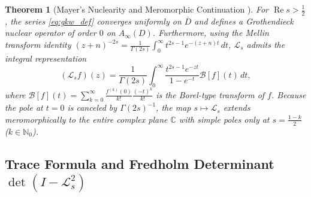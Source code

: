 \documentclass[11pt,a4paper]{article}
\newtheorem{theorem}{Theorem}[section]
\newcommand{\Det}{\operatorname{det}}
\newcommand{\Real}{\operatorname{Re}}
\begin{document}
\begin{theorem}[Mayer's Nuclearity and Meromorphic Continuation \cite{Mayer1990}]
For $\Real s > \frac{1}{2}$, the series \eqref{eq:gkw_def} converges uniformly on $\overline{D}$ and defines a Grothendieck nuclear operator of order $0$ on $A_\infty(D)$. Furthermore, using the Mellin transform identity $(z+n)^{-2s} = \frac{1}{\Gamma(2s)}\int_0^\infty t^{2s-1} e^{-(z+n)t}\,dt$, $\mathcal{L}_s$ admits the integral representation
\begin{equation}
(\mathcal{L}_s f)(z) = \frac{1}{\Gamma(2s)} \int_0^\infty \frac{t^{2s-1} e^{-zt}}{1 - e^{-t}} \mathcal{B}[f](t)\,dt,
\end{equation}
where $\mathcal{B}[f](t) = \sum_{k=0}^\infty \frac{f^{(k)}(0)}{k!} \frac{(-t)^k}{k!}$ is the Borel-type transform of $f$. Because the pole at $t = 0$ is canceled by $\Gamma(2s)^{-1}$, the map $s \mapsto \mathcal{L}_s$ extends meromorphically to the entire complex plane $\mathbb{C}$ with simple poles only at $s = \frac{1-k}{2}$ ($k \in \mathbb{N}_0$).
\end{theorem}

\subsection{Trace Formula and Fredholm Determinant $\Det(I - \mathcal{L}_s^2)$}
\end{document}
